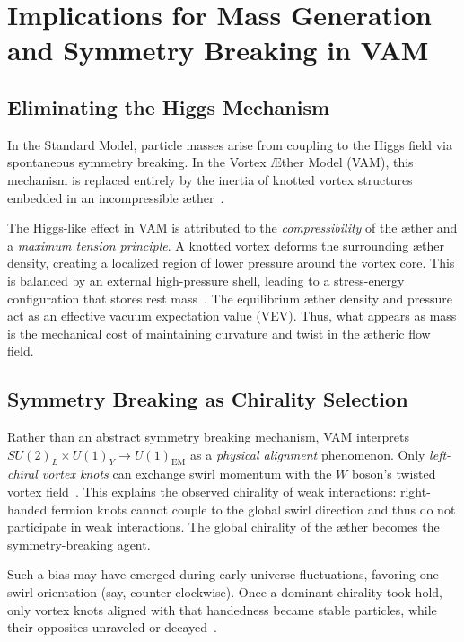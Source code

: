 \section*{Implications for Mass Generation and Symmetry Breaking in VAM}

\subsection*{Eliminating the Higgs Mechanism}

In the Standard Model, particle masses arise from coupling to the Higgs field via spontaneous symmetry breaking. In the Vortex Æther Model (VAM), this mechanism is replaced entirely by the inertia of knotted vortex structures embedded in an incompressible æther~\cite{iskandarani2025vam5}.

The Higgs-like effect in VAM is attributed to the \emph{compressibility} of the æther and a \emph{maximum tension principle}. A knotted vortex deforms the surrounding æther density, creating a localized region of lower pressure around the vortex core. This is balanced by an external high-pressure shell, leading to a stress-energy configuration that stores rest mass~\cite{iskandarani2025vam5}. The equilibrium æther density and pressure act as an effective vacuum expectation value (VEV). Thus, what appears as mass is the mechanical cost of maintaining curvature and twist in the ætheric flow field.

\subsection*{Symmetry Breaking as Chirality Selection}

Rather than an abstract symmetry breaking mechanism, VAM interprets $SU(2)_L \times U(1)_Y \rightarrow U(1)_{\text{EM}}$ as a \emph{physical alignment} phenomenon. Only \emph{left-chiral vortex knots} can exchange swirl momentum with the $W$ boson’s twisted vortex field~\cite{iskandarani2025vam5}. This explains the observed chirality of weak interactions: right-handed fermion knots cannot couple to the global swirl direction and thus do not participate in weak interactions. The global chirality of the æther becomes the symmetry-breaking agent.

Such a bias may have emerged during early-universe fluctuations, favoring one swirl orientation (say, counter-clockwise). Once a dominant chirality took hold, only vortex knots aligned with that handedness became stable particles, while their opposites unraveled or decayed~\cite{iskandarani2025vam5}.

